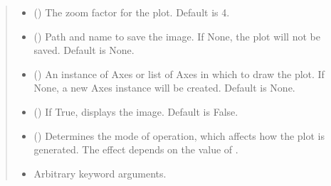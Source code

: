 \documentclass[letterpaper,10pt,english]{sphinxmanual}
\begin{document}
\begin{fulllineitems}
\begin{fulllineitems}
\begin{quote}
\begin{description}
\begin{itemize}
\item {} 
\sphinxAtStartPar
{} (\sphinxstyleliteralemphasis{\sphinxupquote{, }}) \textendash{} The zoom factor for the plot. Default is 4.

\item {} 
\sphinxAtStartPar
{} (\sphinxstyleliteralemphasis{\sphinxupquote{, }}) \textendash{} Path and name to save the image. If None, the plot will not be saved.
Default is None.

\item {} 
\sphinxAtStartPar
{} (\sphinxstyleliteralemphasis{\sphinxupquote{{[}}}\sphinxstyleliteralemphasis{\sphinxupquote{{]}}}\sphinxstyleliteralemphasis{\sphinxupquote{, }}) \textendash{} An instance of Axes or list of Axes in which to draw the plot. If None,
a new Axes instance will be created. Default is None.

\item {} 
\sphinxAtStartPar
{} (\sphinxstyleliteralemphasis{\sphinxupquote{, }}) \textendash{} If True, displays the image. Default is False.

\item {} 
\sphinxAtStartPar
{} (\sphinxstyleliteralemphasis{\sphinxupquote{, }}) \textendash{} Determines the mode of operation, which affects how the plot is
generated. The effect depends on the value of .

\item {} 
\sphinxAtStartPar
{} \textendash{} Arbitrary keyword arguments.

\end{itemize}


\end{description}
\end{quote}
\end{fulllineitems}
\end{fulllineitems}
\end{document}
